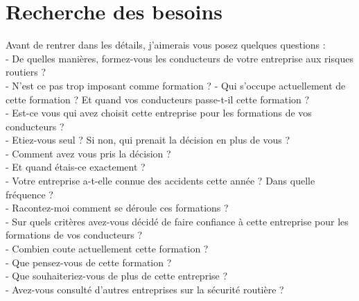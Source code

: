 \documentclass{article}
\begin{document}
\section{Recherche des besoins}
Avant de rentrer dans les détails, j'aimerais vous posez quelques questions :
\vspace{0.2cm}\\
- De quelles manières, formez-vous les conducteurs de votre entreprise aux risques routiers ?\\
- N'est ce pas trop imposant comme formation ?
- Qui s'occupe actuellement de cette formation ? Et quand vos conducteurs passe-t-il cette formation ?\\
- Est-ce vous qui avez choisit cette entreprise pour les formations de vos conducteurs ?\\
- Etiez-vous seul ? Si non, qui prenait la décision en plus de vous ?\\
- Comment avez vous pris la décision ?\\
- Et quand étais-ce exactement ? \\
- Votre entreprise a-t-elle connue des accidents cette année ? Dans quelle fréquence ?\\
- Racontez-moi comment se déroule ces formations ?\\
- Sur quels critères avez-vous décidé de faire confiance à cette entreprise pour les formations de vos conducteurs ?\\
- Combien coute actuellement cette formation ?\\
- Que pensez-vous de cette formation ?\\
- Que souhaiteriez-vous de plus de cette entreprise ?\\
- Avez-vous consulté d'autres entreprises sur la sécurité routière ?
\vspace{0.2cm}\\
\end{document}
